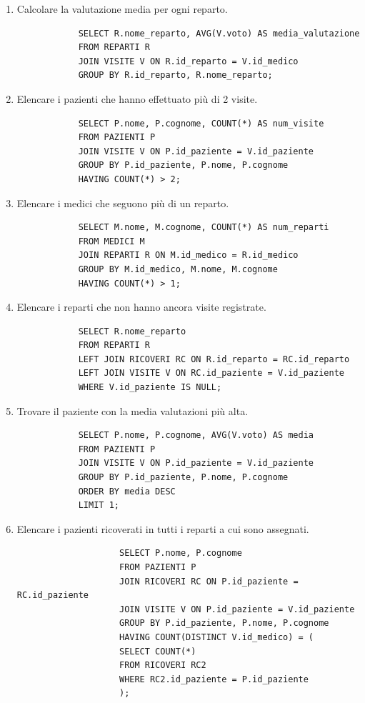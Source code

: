 \documentclass[a4paper,12pt]{article}
\begin{document}
\begin{enumerate}
		\item Calcolare la valutazione media per ogni reparto.
		\begin{verbatim}
			SELECT R.nome_reparto, AVG(V.voto) AS media_valutazione
			FROM REPARTI R
			JOIN VISITE V ON R.id_reparto = V.id_medico
			GROUP BY R.id_reparto, R.nome_reparto;
		\end{verbatim}
		
		\item Elencare i pazienti che hanno effettuato più di 2 visite.
		\begin{verbatim}
			SELECT P.nome, P.cognome, COUNT(*) AS num_visite
			FROM PAZIENTI P
			JOIN VISITE V ON P.id_paziente = V.id_paziente
			GROUP BY P.id_paziente, P.nome, P.cognome
			HAVING COUNT(*) > 2;
		\end{verbatim}
		
		\item Elencare i medici che seguono più di un reparto.
		\begin{verbatim}
			SELECT M.nome, M.cognome, COUNT(*) AS num_reparti
			FROM MEDICI M
			JOIN REPARTI R ON M.id_medico = R.id_medico
			GROUP BY M.id_medico, M.nome, M.cognome
			HAVING COUNT(*) > 1;
		\end{verbatim}
		
		\item Elencare i reparti che non hanno ancora visite registrate.
		\begin{verbatim}
			SELECT R.nome_reparto
			FROM REPARTI R
			LEFT JOIN RICOVERI RC ON R.id_reparto = RC.id_reparto
			LEFT JOIN VISITE V ON RC.id_paziente = V.id_paziente
			WHERE V.id_paziente IS NULL;
		\end{verbatim}
		
		\item Trovare il paziente con la media valutazioni più alta.
		\begin{verbatim}
			SELECT P.nome, P.cognome, AVG(V.voto) AS media
			FROM PAZIENTI P
			JOIN VISITE V ON P.id_paziente = V.id_paziente
			GROUP BY P.id_paziente, P.nome, P.cognome
			ORDER BY media DESC
			LIMIT 1;
		\end{verbatim}
		
		\item Elencare i pazienti ricoverati in tutti i reparti
		a cui sono assegnati.
		\begin{verbatim}
					SELECT P.nome, P.cognome
					FROM PAZIENTI P
					JOIN RICOVERI RC ON P.id_paziente = RC.id_paziente
					JOIN VISITE V ON P.id_paziente = V.id_paziente
					GROUP BY P.id_paziente, P.nome, P.cognome
					HAVING COUNT(DISTINCT V.id_medico) = (
					SELECT COUNT(*)
					FROM RICOVERI RC2
					WHERE RC2.id_paziente = P.id_paziente
					);
		\end{verbatim}
		

\end{enumerate}
\end{document}
